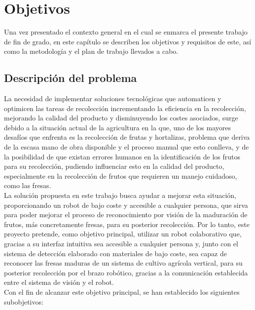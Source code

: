 \chapter{Objetivos}
\label{cap:capitulo3}
\setcounter{footnote}{12}
 
Una vez presentado el contexto general en el cual se enmarca el presente trabajo de fin de grado, en este capítulo se describen los objetivos y requisitos de este, así como la metodología y el plan de trabajo llevados a cabo.

\section{Descripción del problema}
\label{sec:descripcion}

La necesidad de implementar soluciones tecnológicas que automaticen y optimicen las tareas de recolección incrementando la eficiencia en la recolección, mejorando la calidad del producto y disminuyendo los costes asociados, surge debido a la situación actual de la agricultura en la que, uno de los mayores desafíos que enfrenta es la recolección de frutas y hortalizas, problema que deriva de la escasa mano de obra disponible y el proceso manual que esto conlleva, y de la posibilidad de que existan errores humanos en la identificación de los frutos para su recolección, pudiendo influenciar esto en la calidad del producto, especialmente en la recolección de frutos que requieren un manejo cuidadoso, como las fresas.\\

La solución propuesta en este trabajo busca ayudar a mejorar esta situación, proporcionando un robot de bajo coste y accesible a cualquier persona, que sirva para poder mejorar el proceso de reconocimiento por visión de la maduración de frutos, más concretamente fresas, para su posterior recolección. Por lo tanto, este proyecto pretende, como objetivo principal, utilizar un robot colaborativo que, gracias a su interfaz intuitiva sea accesible a cualquier persona y, junto con el sistema de detección elaborado con materiales de bajo coste, sea capaz de reconocer las fresas maduras de un sistema de cultivo agrícola vertical, para su posterior recolección por el brazo robótico, gracias a la comunicación establecida entre el sistema de visión y el robot.\\

Con el fin de alcanzar este objetivo principal, se han establecido los siguientes
subobjetivos:

